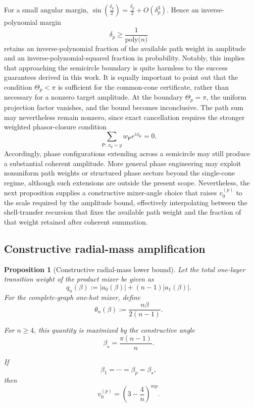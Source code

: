 \documentclass[a4paper,onecolumn,11pt,unpublished]{quantumarticle}
\newcommand{\poly}[1]{\mathrm{poly}\bigl(#1\bigr)}
\newtheorem{proposition}[theorem]{Proposition}
\theoremstyle{remark}
\begin{document}
For a small angular margin, \(
\sin
\left(
\frac{\delta_p}{2}
\right)
=
\frac{\delta_p}{2}
+
O(\delta_p^3).
\)
Hence an inverse-polynomial margin
\begin{equation}
\label{eq:inverse-polynomial-angular-margin}
\delta_p
\ge
\frac{1}{\poly n}
\end{equation}
retains an inverse-polynomial fraction of the available path weight in
amplitude and an inverse-polynomial-squared fraction in probability. Notably, this implies that approaching the semicircle boundary is quite harmless to the success guarantees derived in this work. It is equally important to point out that the condition \(\Theta_p<\pi\) is sufficient for the common-cone certificate, rather than necessary for a nonzero target amplitude. At the boundary \(\Theta_p=\pi\), the uniform projection factor vanishes, and the bound becomes inconclusive. The path sum may nevertheless remain nonzero, since exact cancellation requires the stronger weighted phasor-closure condition
\begin{equation}
\label{eq:weighted-path-phasor-closure}
\sum_{\mathsf P:\,x_p=y}
w_{\mathsf P}e^{i\phi_{\mathsf P}}
=
0.
\end{equation}
Accordingly, phase configurations extending across a semicircle may
still produce a substantial coherent amplitude. More general phase
engineering may exploit nonuniform path weights or structured phase
sectors beyond the single-cone regime, although such extensions are
outside the present scope. Nevertheless, the next proposition supplies a constructive mixer-angle choice that raises \(v_0^{(p)}\) to the scale required by the amplitude bound, effectively interpolating between the shell-transfer recursion that fixes the available path weight and the fraction of that weight retained after coherent summation. 







\subsection{Constructive radial-mass amplification}
\begin{proposition}[Constructive radial-mass lower bound]
\label{prop:constructive-radial-mass-lower-bound}
Let the total one-layer transition weight of the product mixer be given as 
\begin{equation}
q_n(\beta):=|a_0(\beta)|+(n-1)|a_1(\beta)|.
\label{eq:one-layer-weight}
\end{equation}
For the complete-graph one-hot mixer, define
\[
\theta_n(\beta):=\frac{n\beta}{2(n-1)}.
\]

For \(n\ge4\), this quantity is maximized by the constructive angle
\[
\beta_\star=\frac{\pi(n-1)}{n}.
\]

If
\[
\beta_1=\cdots=\beta_p=\beta_\star,
\]
then
\begin{equation}
\label{eq:v0-star-exact}
v_0^{(p)}
=
\left(3-\frac{4}{n}\right)^{mp}.
\end{equation}

\end{proposition}
\end{document}
